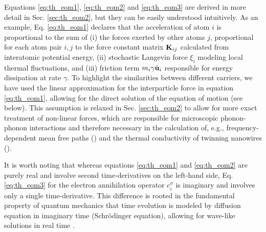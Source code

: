 Equations \eqref{eq:th_eom1}, \eqref{eq:th_eom2} and \eqref{eq:th_eom3} are derived in more detail in Sec. \ref{sec:th_eom2}, but they can be easily understood intuitively. As an example, Eq. \eqref{eq:th_eom1} declares that the acceleration of atom $i$ is proportional to the sum of (i) the forces exerted by other atoms $j$, proportional for each atom pair $i,j$ to the force constant matrix $\mathbf{K}_{ij}$ calculated from interatomic potential energy, (ii) stochastic Langevin force $\xi_i$ modeling local thermal fluctuations, and (iii) friction term $m_i \gamma \dot{\mathbf{u}}_i$ responsible for energy dissipation at rate $\gamma$. To highlight the similarities between different carriers, we have used the linear approximation for the interparticle force in equation \eqref{eq:th_eom1}, allowing for the direct solution of the equation of motion (see below). This assumption is relaxed in Sec. \ref{sec:th_eom2} to allow for more exact treatment of non-linear forces, which are responsible for microscopic phonon-phonon interactions and therefore necessary in the calculation of, e.g., frequency-dependent mean free paths () and the thermal conductivity of twinning nanowires (). %

It is worth noting that whereas equations \eqref{eq:th_eom1} and \eqref{eq:th_eom2} are purely real and involve second time-derivatives on the left-hand side, Eq. \eqref{eq:th_eom3} for the electron annihilation operator $c_i^{\sigma}$ is imaginary and involves only a single time-derivative. This difference is rooted in the fundamental property of quantum mechanics that time evolution is modeled by diffusion equation in imaginary time (Schr\"odinger equation), allowing for wave-like solutions in real time \cite{ballentine}.




